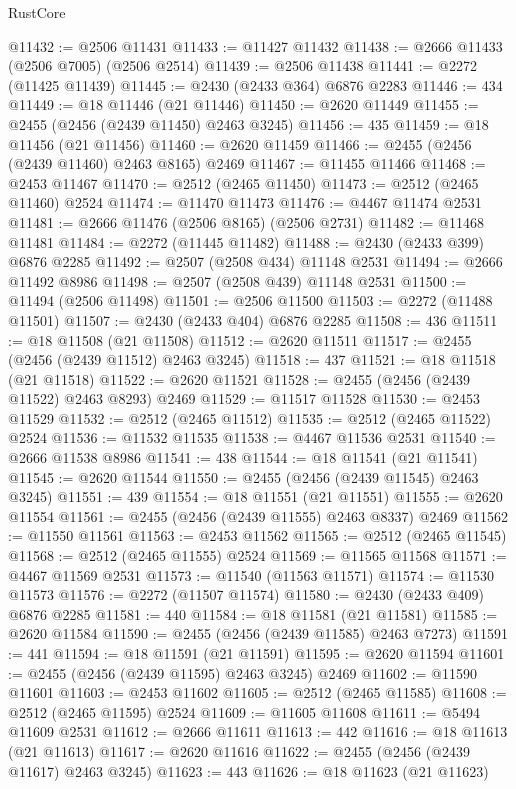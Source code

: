 \begin{lexlean}{RustCore}
\begin{coremodule}
@11432 := @2506 @11431
@11433 := @11427 @11432
@11438 := @2666 @11433 (@2506 @7005) (@2506 @2514)
@11439 := @2506 @11438
@11441 := @2272 (@11425 @11439)
@11445 := @2430 (@2433 @364) @6876 @2283
@11446 := 434
@11449 := @18 @11446 (@21 @11446)
@11450 := @2620 @11449
@11455 := @2455 (@2456 (@2439 @11450) @2463 @3245)
@11456 := 435
@11459 := @18 @11456 (@21 @11456)
@11460 := @2620 @11459
@11466 := @2455 (@2456 (@2439 @11460) @2463 @8165) @2469
@11467 := @11455 @11466
@11468 := @2453 @11467
@11470 := @2512 (@2465 @11450)
@11473 := @2512 (@2465 @11460) @2524
@11474 := @11470 @11473
@11476 := @4467 @11474 @2531
@11481 := @2666 @11476 (@2506 @8165) (@2506 @2731)
@11482 := @11468 @11481
@11484 := @2272 (@11445 @11482)
@11488 := @2430 (@2433 @399) @6876 @2285
@11492 := @2507 (@2508 @434) @11148 @2531
@11494 := @2666 @11492 @8986
@11498 := @2507 (@2508 @439) @11148 @2531
@11500 := @11494 (@2506 @11498)
@11501 := @2506 @11500
@11503 := @2272 (@11488 @11501)
@11507 := @2430 (@2433 @404) @6876 @2285
@11508 := 436
@11511 := @18 @11508 (@21 @11508)
@11512 := @2620 @11511
@11517 := @2455 (@2456 (@2439 @11512) @2463 @3245)
@11518 := 437
@11521 := @18 @11518 (@21 @11518)
@11522 := @2620 @11521
@11528 := @2455 (@2456 (@2439 @11522) @2463 @8293) @2469
@11529 := @11517 @11528
@11530 := @2453 @11529
@11532 := @2512 (@2465 @11512)
@11535 := @2512 (@2465 @11522) @2524
@11536 := @11532 @11535
@11538 := @4467 @11536 @2531
@11540 := @2666 @11538 @8986
@11541 := 438
@11544 := @18 @11541 (@21 @11541)
@11545 := @2620 @11544
@11550 := @2455 (@2456 (@2439 @11545) @2463 @3245)
@11551 := 439
@11554 := @18 @11551 (@21 @11551)
@11555 := @2620 @11554
@11561 := @2455 (@2456 (@2439 @11555) @2463 @8337) @2469
@11562 := @11550 @11561
@11563 := @2453 @11562
@11565 := @2512 (@2465 @11545)
@11568 := @2512 (@2465 @11555) @2524
@11569 := @11565 @11568
@11571 := @4467 @11569 @2531
@11573 := @11540 (@11563 @11571)
@11574 := @11530 @11573
@11576 := @2272 (@11507 @11574)
@11580 := @2430 (@2433 @409) @6876 @2285
@11581 := 440
@11584 := @18 @11581 (@21 @11581)
@11585 := @2620 @11584
@11590 := @2455 (@2456 (@2439 @11585) @2463 @7273)
@11591 := 441
@11594 := @18 @11591 (@21 @11591)
@11595 := @2620 @11594
@11601 := @2455 (@2456 (@2439 @11595) @2463 @3245) @2469
@11602 := @11590 @11601
@11603 := @2453 @11602
@11605 := @2512 (@2465 @11585)
@11608 := @2512 (@2465 @11595) @2524
@11609 := @11605 @11608
@11611 := @5494 @11609 @2531
@11612 := @2666 @11611
@11613 := 442
@11616 := @18 @11613 (@21 @11613)
@11617 := @2620 @11616
@11622 := @2455 (@2456 (@2439 @11617) @2463 @3245)
@11623 := 443
@11626 := @18 @11623 (@21 @11623)

\end{coremodule}
\end{lexlean}
